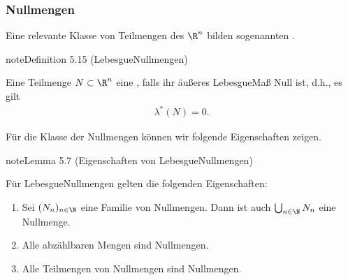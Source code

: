 \documentclass[letterpaper,10pt,german]{jupyterBook}
\begin{document}
\subsubsection{Nullmengen}
\label{\detokenize{masstheorie/masstheorie:nullmengen}}
\sphinxAtStartPar
Eine relevante Klasse von Teilmengen des \(\R^n\) bilden sogenannten .
\label{masstheorie/masstheorie:definition-32}
\begin{sphinxadmonition}{note}{Definition 5.15 (Lebesgue\sphinxhyphen{}Nullmengen)}



\sphinxAtStartPar
Eine Teilmenge \(N \subset \R^n\) eine , falls ihr äußeres Lebesgue\sphinxhyphen{}Maß Null ist, d.h., es gilt
\begin{equation*}
\begin{split}\lambda^*(N) = 0.\end{split}
\end{equation*}\end{sphinxadmonition}

\sphinxAtStartPar
Für die Klasse der Nullmengen können wir folgende Eigenschaften zeigen.
\label{masstheorie/masstheorie:lem:eigenschaftenNullmengen}
\begin{sphinxadmonition}{note}{Lemma 5.7 (Eigenschaften von Lebesgue\sphinxhyphen{}Nullmengen)}



\sphinxAtStartPar
Für Lebesgue\sphinxhyphen{}Nullmengen gelten die folgenden Eigenschaften:
\begin{enumerate}
%
\item {} 
\sphinxAtStartPar
Sei \((N_n)_{n\in\N}\) eine Familie von Nullmengen.
Dann ist auch \(\bigcup_{n\in\N} N_n\) eine Nullmenge.

\item {} 
\sphinxAtStartPar
Alle abzählbaren Mengen sind Nullmengen.

\item {} 
\sphinxAtStartPar
Alle Teilmengen von Nullmengen sind Nullmengen.

\end{enumerate}
\end{sphinxadmonition}
\end{document}
